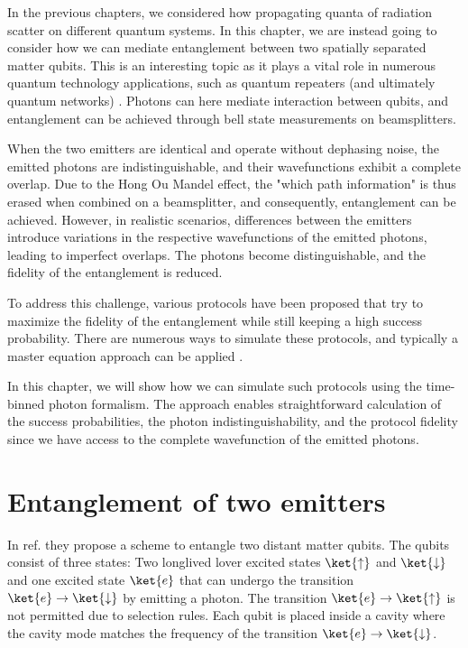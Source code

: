 In the previous chapters, we considered how propagating quanta of radiation scatter on different quantum systems. In this chapter, we are instead going to consider how we can mediate entanglement between two 
spatially separated matter qubits. This is an interesting topic as it plays a vital role in numerous quantum technology applications, such as quantum repeaters (and ultimately quantum networks) \cite{}. Photons can here mediate interaction between qubits, and entanglement can be achieved through bell state measurements on beamsplitters.

When the two emitters are identical and operate without dephasing noise, the emitted photons are indistinguishable, and their wavefunctions exhibit a complete overlap. Due to the Hong Ou Mandel effect\cite{MANDEL}, the "which path information" is thus erased when combined on a beamsplitter, and consequently, entanglement can be achieved. However, in realistic scenarios, differences between the emitters introduce variations in the respective wavefunctions of the emitted photons, leading to imperfect overlaps. The photons become distinguishable, and the fidelity of the entanglement is reduced. 

To address this challenge, various protocols have been proposed that try to maximize the fidelity of the entanglement while still keeping a high success probability. There are numerous ways to simulate these protocols, and typically a master equation approach can be applied \cite{Barrett2004EfficientOptics}.

In this chapter, we will show how we can simulate such protocols using the time-binned photon formalism. The approach enables straightforward calculation of the success probabilities, the photon indistinguishability, and the protocol fidelity since we have access to the complete wavefunction of the emitted photons. 

\section{Entanglement of two emitters}

In ref. \cite{Barrett2004EfficientOptics} they propose a scheme to entangle two distant matter qubits. The qubits consist of three states: Two longlived lover excited states $\ket{\uparrow}$ and $\ket{\downarrow}$ and one excited state $\ket{e}$ that can undergo the transition $\ket{e} \rightarrow \ket{\downarrow}$ by emitting a photon. The transition $\ket{e} \rightarrow \ket{\uparrow}$ is not permitted due to selection rules. Each qubit is placed inside a cavity where the cavity mode matches the frequency of the transition $\ket{e} \rightarrow \ket{\downarrow}$.

